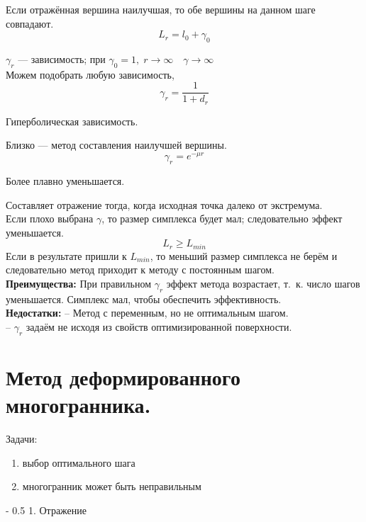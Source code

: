 \documentclass[12pt,a5paper]{scrbook}
\makeatletter
\renewcommand\paragraph{\@startsection{paragraph}{4}{0mm}%
{-\baselineskip} %
{0.5\baselineskip} %
{\normalfont\bfseries}}%
\makeatother
\begin{document}
  Если отражённая вершина наилучшая, то обе вершины на данном шаге совпадают. 
  $$L_r = l_0 + \gamma_0$$
  
  $\gamma_r$ --- зависимость; при $\gamma_0 = 1,\;r\rightarrow\infty\quad \gamma\rightarrow\infty$\\
  Можем подобрать любую зависимость,\\
  $$\gamma_r = \frac{1}{1+d_r}$$ 
  \begin{center}Гиперболическая зависимость.\end{center}
  Близко --- метод составления наилучшей вершины.
  $$\gamma_r = e^{-\mu r}$$ 
  \begin{center}Более плавно уменьшается.\end{center}
  Составляет отражение тогда, когда исходная точка далеко от экстремума.\\
  
  Если плохо выбрана $\gamma$, то размер симплекса будет мал; следовательно эффект уменьшается.
  $$L_r \geq L_{min}$$
  Если в результате пришли к $L_{min}$, то меньший размер симплекса не берём и следовательно метод приходит к методу с постоянным шагом.\\
  
  \textbf{Преимущества:}\newline
  При правильном $\gamma_r$ эффект метода возрастает, т.~к. число шагов уменьшается. Симплекс мал, чтобы обеспечить эффективность.\\
  
  \textbf{Недостатки:}\newline
  -- Метод с переменным, но не оптимальным шагом.\\
  -- $\gamma_r$ задаём не исходя из свойств оптимизированной поверхности.
  
  \section{Метод деформированного многогранника.} %
  Задачи:
  \begin{enumerate}
    \item выбор оптимального шага
    \item многогранник может быть неправильным
  \end{enumerate}
  
  \paragraph{1. Отражение}
  
\end{document}
